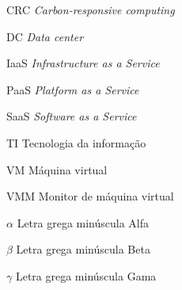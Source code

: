 \documentclass[
	12pt,				%
	oneside,			%
	a4paper,			%
	english,			%
	brazil				%
	]{abntex2ppgsi}
\begin{document}
\frenchspacing 


%
% 
%
\imprimircapa

\imprimirfolhaderosto*

\listoffigures*
\cleardoublepage

%
%
\begin{siglas}
  \item[CRC] \textit{Carbon-responsive computing}
  \item[DC] \textit{Data center}
  \item[IaaS] \textit{Infrastructure as a Service}
  \item[PaaS] \textit{Platform as a Service}
  \item[SaaS] \textit{Software as a Service}
  \item[TI] Tecnologia da informação
  \item[VM] Máquina virtual
  \item[VMM] Monitor de máquina virtual
\end{siglas}


%
% 
\begin{simbolos}
	\item[$ \alpha $] Letra grega minúscula Alfa
	\item[$ \beta $] Letra grega minúscula Beta
	\item[$ \gamma $] Letra grega minúscula Gama
  \end{simbolos}
\end{document}
